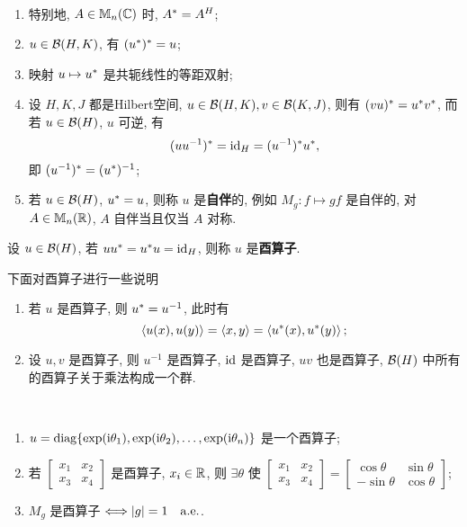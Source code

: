 	\begin{Remark}~
		\begin{enumerate}[(1)]
			\item 特别地, $ A\in\mathbb{M}_{n}(\mathbb{C}) $ 时, $ A^{*}=A^{H} $;
			\item $ u\in\mathcal{B}(H, K) $, 有 $ (u^{*})^{*}=u $;
			\item 映射 $ u\mapsto u^{*} $ 是共轭线性的等距双射;
			\item 设 $ H, K, J $ 都是Hilbert空间, $ u\in\mathcal{B}(H, K), v\in\mathcal{B}(K, J) $, 则有 $ (vu)^{*}=u^{*}v^{*} $, 而若 $ u\in\mathcal{B}(H) $, $ u $ 可逆, 有
			\[
				(uu^{-1})^{*}=\mathrm{id}_{H}=(u^{-1})^{*}u^{*},
			\]
			即 $ (u^{-1})^{*}=(u^{*})^{-1} $;
			\item 若 $ u\in\mathcal{B}(H) $, $ u^{*}=u $, 则称 $ u $ 是\textbf{自伴}的, 例如 $ M_{g}: f\mapsto gf $ 是自伴的, 对 $ A\in\mathbb{M}_{n}(\mathbb{R}) $, $ A $ 自伴当且仅当 $ A $ 对称.
		\end{enumerate}
	\end{Remark}
	\begin{Definition}[酉算子]\label{def:酉算子}
			 设 $ u\in \mathcal{B}(H) $, 若 $ uu^{*}=u^{*}u=\mathrm{id}_{H} $, 则称 $ u $ 是\textbf{酉算子}.
	\end{Definition}
	\begin{Remark}
		下面对酉算子进行一些说明
		\begin{enumerate}[(1)]
			\item 若 $ u $ 是酉算子, 则 $ u^{*}=u^{-1} $, 此时有
			\[
				\left\langle u(x), u(y) \right\rangle=\left\langle x, y \right\rangle=\left\langle u^{*}(x), u^{*}(y) \right\rangle;
			\]
			\item 设 $ u, v $ 是酉算子, 则 $ u^{-1} $ 是酉算子, $ \mathrm{id} $ 是酉算子, $ uv $ 也是酉算子, $ \mathcal{B}(H) $ 中所有的酉算子关于乘法构成一个群.
		\end{enumerate}
	\end{Remark}

	\begin{Example}~
		\begin{enumerate}[(1)]
			\item $ u=\mathrm{diag}\{ \exp(\mathrm{i} \theta_{1}), \exp(\mathrm{i}\theta_{2}), \dots, \exp(\mathrm{i}\theta_{n}) \} $ 是一个酉算子;
			\item 若
		$ \left[\begin{smallmatrix}
		x_{1} & x_{2}\\
		x_{3} & x_{4}	
		\end{smallmatrix}\right] $ 是酉算子, $ x_{i}\in\mathbb{R} $, 则 $ \exists\theta $ 使 
		$ \left[\begin{smallmatrix}
			x_{1} & x_{2}\\
			x_{3} & x_{4}
		\end{smallmatrix}\right]=\left[\begin{smallmatrix}
			\cos\theta & \sin\theta \\
			-\sin\theta & \cos\theta
		\end{smallmatrix}\right] $;
		\item $ M_{g} $ 是酉算子 $ \Longleftrightarrow\left| g \right| =1\quad \mathrm{a.e.} $.
		\end{enumerate}
	\end{Example}

